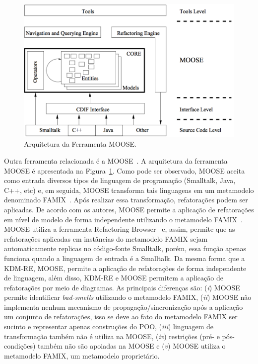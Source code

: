 \begin{figure}[h]
	\centering
	\caption{Arquitetura da Ferramenta MOOSE.}
	\label{fig:moose}
	\includegraphics[scale=0.32]{images/MOOSEArchitecture}
\end{figure}


Outra ferramenta relacionada é a MOOSE~\cite{tichelaar2000meta, ducasse2000moose}. A arquitetura da ferramenta MOOSE é apresentada na Figura~\ref{fig:moose}. Como pode ser observado, MOOSE aceita como entrada diversos tipos de linguagem de programação (Smalltalk, Java, C++, etc) e, em seguida, MOOSE transforma tais linguagens em um metamodelo denominado FAMIX~\cite{tichelaar2000meta}. Após realizar essa transformação, refatorações podem ser aplicadas. De acordo com os autores, MOOSE permite a aplicação de refatorações em nível de modelo de forma independente utilizando o metamodelo FAMIX~\cite{tichelaar2000meta}. MOOSE utiliza a ferramenta Refactoring Browser~\cite{roberts1997refactoring} e, assim, permite que as refatorações aplicadas em instâncias do metamodelo FAMIX sejam automaticamente replicas no código-fonte Smalltalk, porém, essa função apenas funciona quando a linguagem de entrada é a Smalltalk. Da mesma forma que a KDM-RE, MOOSE, permite a aplicação de refatorações de forma independente de linguagem, além disso, KDM-RE e MOOSE permitem a aplicação de refatorações por meio de diagramas. As principais diferenças são: (\textit{i}) MOOSE permite identificar \textit{bad-smells} utilizando o metamodelo FAMIX, (\textit{ii}) MOOSE não implementa nenhum mecanismo de propagação/sincronização após a aplicação um conjunto de refatorações, isso se deve ao fato do metamodelo FAMIX ser sucinto e representar apenas construções do POO, (\textit{iii}) linguagem de transformação também não é utiliza na MOOSE, (\textit{iv}) restrições (pré- e pós-condições) também não são apoiadas na MOOSE e (\textit{v}) MOOSE utiliza o metamodelo FAMIX, um metamodelo proprietário.

